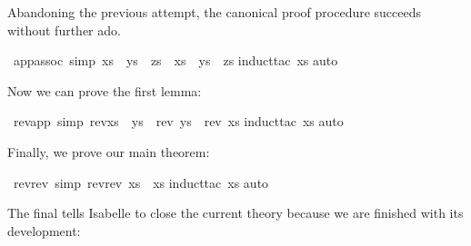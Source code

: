 \begin{isabellebody}
%
\isamarkuptrue%
%
\begin{isamarkuptext}%
Abandoning the previous attempt, the canonical proof procedure
succeeds without further ado.%
\end{isamarkuptext}%
\isamarkuptrue%
\ app{\isacharunderscore}assoc\ {\isacharbrackleft}simp{\isacharbrackright}{\isacharcolon}\ {\isachardoublequote}{\isacharparenleft}xs\ {\isacharat}\ ys{\isacharparenright}\ {\isacharat}\ zs\ {\isacharequal}\ xs\ {\isacharat}\ {\isacharparenleft}ys\ {\isacharat}\ zs{\isacharparenright}{\isachardoublequote}\isanewline
\isamarkupfalse%
induct{\isacharunderscore}tac\ xs{\isacharparenright}\isanewline
\isamarkupfalse%
auto{\isacharparenright}\isanewline
\isamarkupfalse%
\isamarkupfalse%
%
\begin{isamarkuptext}%
\noindent
Now we can prove the first lemma:%
\end{isamarkuptext}%
\isamarkuptrue%
\ rev{\isacharunderscore}app\ {\isacharbrackleft}simp{\isacharbrackright}{\isacharcolon}\ {\isachardoublequote}rev{\isacharparenleft}xs\ {\isacharat}\ ys{\isacharparenright}\ {\isacharequal}\ {\isacharparenleft}rev\ ys{\isacharparenright}\ {\isacharat}\ {\isacharparenleft}rev\ xs{\isacharparenright}{\isachardoublequote}\isanewline
\isamarkupfalse%
induct{\isacharunderscore}tac\ xs{\isacharparenright}\isanewline
\isamarkupfalse%
auto{\isacharparenright}\isanewline
\isamarkupfalse%
\isamarkupfalse%
%
\begin{isamarkuptext}%
\noindent
Finally, we prove our main theorem:%
\end{isamarkuptext}%
\isamarkuptrue%
\ rev{\isacharunderscore}rev\ {\isacharbrackleft}simp{\isacharbrackright}{\isacharcolon}\ {\isachardoublequote}rev{\isacharparenleft}rev\ xs{\isacharparenright}\ {\isacharequal}\ xs{\isachardoublequote}\isanewline
\isamarkupfalse%
induct{\isacharunderscore}tac\ xs{\isacharparenright}\isanewline
\isamarkupfalse%
auto{\isacharparenright}\isanewline
\isamarkupfalse%
\isamarkupfalse%
%
\begin{isamarkuptext}%
\noindent
The final  tells Isabelle to close the current theory because
we are finished with its development:%
%
\end{isamarkuptext}%
\isamarkuptrue%
\isanewline
\isamarkupfalse%
\end{isabellebody}%
